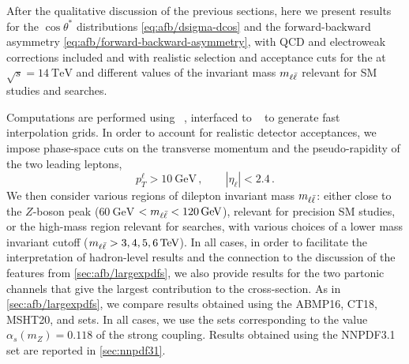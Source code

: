 
After the qualitative discussion of the previous sections, here we
present results for the $\cos\theta^*$
distributions \cref{eq:afb/dsigma-dcos} and the
forward-backward asymmetry \cref{eq:afb/forward-backward-asymmetry}, with
\nlo QCD and electroweak corrections included and
with realistic selection and acceptance cuts for the \lhc at $\sqrt{s} = \SI{14}{\tera\electronvolt}$
and different values of the invariant mass $m_{\ell\bar{\ell}}$ relevant for SM
studies and \bsm searches.

Computations are performed using \mgamc~\cite{Alwall:2014hca},
interfaced to \pineappl~\cite{Carrazza:2020gss,christopher_schwan_2022_7023438} to generate
fast interpolation grids.
%
In order to account for realistic detector acceptances,
we impose phase-space cuts on the transverse momentum and the pseudo-rapidity of the two
leading leptons,
\begin{equation}
  p_T^{\ell} > \SI{10}{\giga\electronvolt} \, ,\qquad |\eta_{\ell}| < 2.4 \,.
\end{equation}
We then consider various regions of dilepton invariant mass $m_{\ell\bar{\ell}}$:
either close to the $Z$-boson peak ($\SI{60}{\giga\electronvolt}$ $< m_{\ell\bar{\ell}} < \SI{120}{\giga\electronvolt}$),
relevant for precision SM studies, or the
high-mass region relevant for \bsm searches, with  various choices of a
lower mass invariant cutoff ($\mll > 3,4,5,\SI{6}{\tera\electronvolt}$).
%
In all cases, in order to facilitate the interpretation of
hadron-level results  and the connection to
the discussion of the \pdf features from \cref{sec:afb/largexpdfs},
we also provide results for the two partonic channels that give the
largest contribution to the cross-section.
%
As in \cref{sec:afb/largexpdfs}, we compare results obtained using
the  ABMP16, CT18, MSHT20, and  \pdf sets.
%
In all cases, we
use the  \nnlo sets corresponding to the value $\alpha_s(m_Z)=0.118$
of the strong coupling.
%
Results obtained using the NNPDF3.1 \pdf set are reported in \cref{sec:nnpdf31}.


